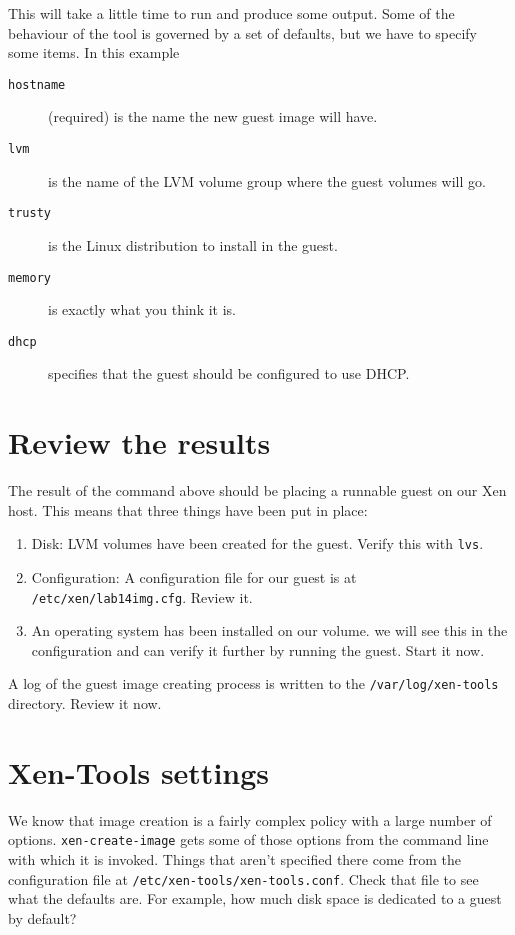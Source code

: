 \documentclass{article}
\begin{document}
This will take a little time to run and produce some output. Some of the behaviour of the tool is governed by
a set of defaults, but we have to specify some items. In this example

\begin{description}
\item[\texttt{hostname}] (required) is the name the new guest image will have.
\item[\texttt{lvm}] is the name of the LVM volume group where the guest volumes will go.
\item[\texttt{trusty}] is the Linux distribution to install in the guest.
\item[\texttt{memory}] is exactly what you think it is.
\item[\texttt{dhcp}] specifies that the guest should be configured to use DHCP.
\end{description}

\section{Review the results}
The result of the command above should be placing a runnable guest on our Xen host. This means that 
three things have been put in place:

\begin{enumerate}
 \item Disk: LVM volumes have been created for the guest. Verify this with \texttt{lvs}.
 \item Configuration: A configuration file for our guest is at \texttt{/etc/xen/lab14img.cfg}. Review it.
 \item An operating system has been installed on our volume. we will see this in the configuration
          and can verify it further by running the guest. Start it now.
\end{enumerate}       
   
A log of the guest image creating process is written to the \texttt{/var/log/xen-tools} directory. Review it now.

\section{Xen-Tools settings}
We know that image creation is a fairly complex policy with a large number of options. \texttt{xen-create-image} 
gets some of those options from the command line with which it is invoked. Things that aren't specified there 
come from the configuration file at \texttt{/etc/xen-tools/xen-tools.conf}. Check that file to see what the defaults
are. For example, how much disk space is dedicated to a guest by default?
\end{document}
